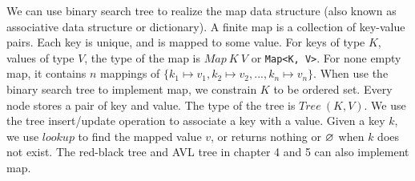 \documentclass[b5paper]{article}
\begin{document}
We can use binary search tree to realize the map data structure (also known as associative data structure or dictionary). A finite map is a collection of key-value pairs. Each key is unique, and is mapped to some value. For keys of type $K$, values of type $V$, the type of the map is $Map\ K\ V$ or \texttt{Map<K, V>}. For none empty map, it contains $n$ mappings of $\{k_1 \mapsto v_1, k_2 \mapsto v_2, ..., k_n \mapsto v_n\}$. When use the binary search tree to implement map, we constrain $K$ to be ordered set. Every node stores a pair of key and value. The type of the tree is $Tree\ (K, V)$. We use the tree insert/update operation to associate a key with a value. Given a key $k$, we use $lookup$ to find the mapped value $v$, or returns nothing or $\varnothing$ when $k$ does not exist. The red-black tree and AVL tree in chapter 4 and 5 can also implement map.

\begin{Exercise}\label{ex:bst-delete}
\end{Exercise}
\end{document}
